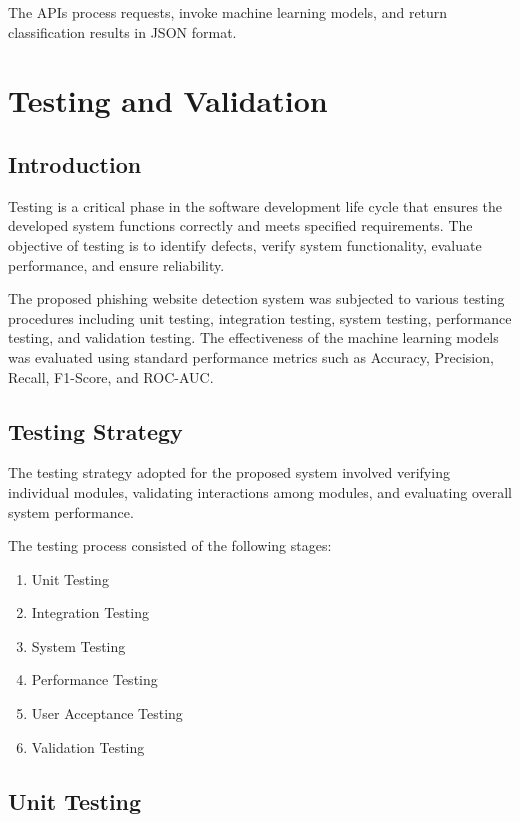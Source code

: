 \documentclass[12pt]{report}
\begin{document}
The APIs process requests, invoke machine learning models, and return classification results in JSON format.


\chapter{Testing and Validation}

\section{Introduction}

Testing is a critical phase in the software development life cycle that ensures the developed system functions correctly and meets specified requirements. The objective of testing is to identify defects, verify system functionality, evaluate performance, and ensure reliability.

The proposed phishing website detection system was subjected to various testing procedures including unit testing, integration testing, system testing, performance testing, and validation testing. The effectiveness of the machine learning models was evaluated using standard performance metrics such as Accuracy, Precision, Recall, F1-Score, and ROC-AUC.

\section{Testing Strategy}

The testing strategy adopted for the proposed system involved verifying individual modules, validating interactions among modules, and evaluating overall system performance.

The testing process consisted of the following stages:

\begin{enumerate}
    \item Unit Testing
    \item Integration Testing
    \item System Testing
    \item Performance Testing
    \item User Acceptance Testing
    \item Validation Testing
\end{enumerate}

\section{Unit Testing}
\end{document}
